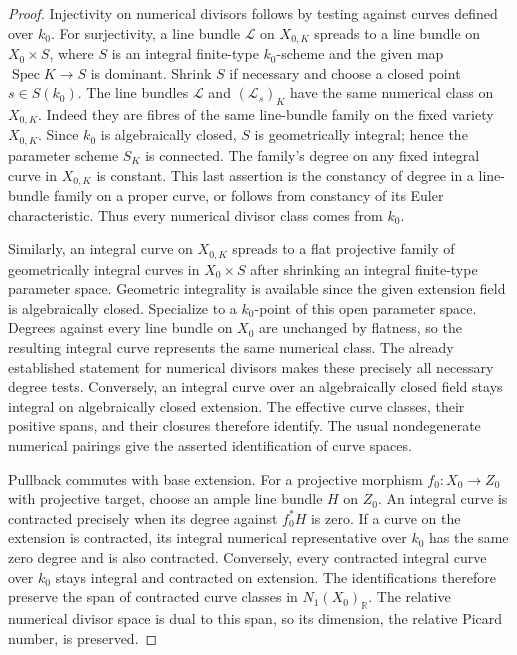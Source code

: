 \begin{proof}
Injectivity on numerical divisors follows by testing against
curves defined over $k_0$.  For surjectivity, a line bundle
$\mathcal L$ on $X_{0,K}$ spreads to a line bundle on
$X_0\times S$, where $S$ is an integral finite-type
$k_0$-scheme and the given map $\operatorname{Spec}K\to S$
is dominant.  Shrink $S$ if necessary and choose a closed point
$s\in S(k_0)$.  The line bundles $\mathcal L$ and
$(\mathcal L_s)_K$ have the same numerical class on $X_{0,K}$.
Indeed they are fibres of the same line-bundle family on the
fixed variety $X_{0,K}$.  Since $k_0$ is algebraically closed, $S$
is geometrically integral; hence the parameter scheme $S_K$ is
connected.  The family's degree on any fixed integral curve in
$X_{0,K}$ is constant.  This last assertion is the constancy of degree
in a line-bundle family on a proper curve, or follows from
constancy of its Euler characteristic.  Thus every numerical
divisor class comes from $k_0$.

Similarly, an integral curve on $X_{0,K}$ spreads to a flat
projective family of geometrically integral curves in
$X_0\times S$ after shrinking an integral finite-type parameter
space.  Geometric integrality is available since the given
extension field is algebraically closed.  Specialize to a
$k_0$-point of this open parameter space.  Degrees against every
line bundle on $X_0$ are unchanged by flatness, so the resulting
integral curve represents the same numerical class.  The
already established statement for numerical divisors makes
these precisely all necessary degree tests.  Conversely, an
integral curve over an algebraically closed field stays
integral on algebraically closed extension.  The effective
curve classes, their positive spans, and their closures
therefore identify.  The usual nondegenerate numerical
pairings give the asserted identification of curve spaces.

Pullback commutes with base extension.  For a projective morphism
$f_0:X_0\to Z_0$ with projective target, choose an ample line
bundle $H$ on $Z_0$.  An integral curve is contracted precisely
when its degree against $f_0^*H$ is zero.  If a curve on the
extension is contracted, its integral numerical representative
over $k_0$ has the same zero degree and is also contracted.
Conversely, every contracted integral curve over $k_0$ stays
integral and contracted on extension.  The identifications
therefore preserve the span of contracted curve classes in
$N_1(X_0)_{\mathbb R}$.  The relative numerical divisor space
is dual to this span, so its dimension, the relative Picard
number, is preserved.
\end{proof}

